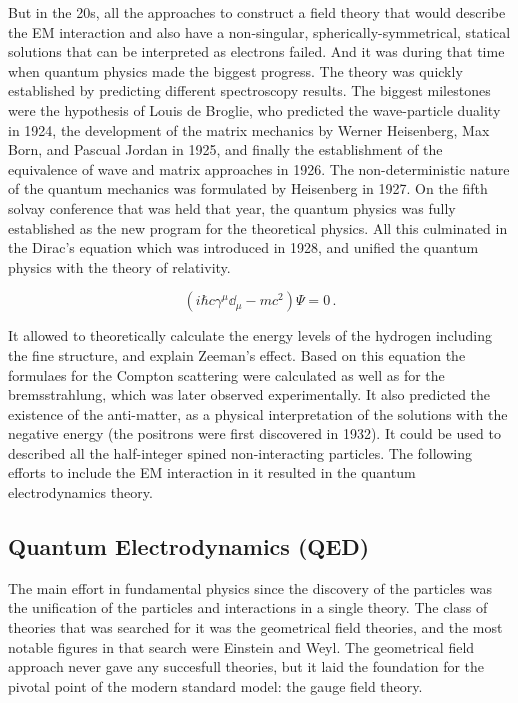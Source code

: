 But in the 20s, all the approaches to construct a field theory that would describe the EM interaction and also have a non-singular, spherically-symmetrical, statical solutions that can be interpreted as electrons failed. And it was during that time when quantum physics made the biggest progress. The theory was quickly established by predicting different spectroscopy results. The biggest milestones were the hypothesis of Louis de Broglie, who predicted the wave-particle duality in 1924, the development of the matrix mechanics by Werner Heisenberg, Max Born, and Pascual Jordan in 1925, and finally the establishment of the equivalence of wave and matrix approaches in 1926. The non-deterministic nature of the quantum mechanics was formulated by Heisenberg in 1927. On the fifth solvay conference that was held that year, the quantum physics was fully established as the new program for the theoretical physics. All this culminated in the Dirac's equation which was introduced in 1928, and unified the quantum physics with the theory of relativity.

\begin{equation}
(i \hbar c \gamma^{\mu} \dd_{\mu} - m c^{2})\Psi = 0\,.
\end{equation}

It allowed to theoretically calculate the energy levels of the hydrogen including the fine structure, and explain Zeeman's effect. Based on this equation the formulaes for the Compton scattering were calculated as well as for the bremsstrahlung, which was later observed experimentally. It also predicted the existence of the anti-matter, as a physical interpretation of the solutions with the negative energy (the positrons were first discovered in 1932). It could be used to described all the half-integer spined non-interacting particles. The following efforts to include the EM interaction in it resulted in the quantum electrodynamics theory.

\subsection{Quantum Electrodynamics (QED)}

The main effort in fundamental physics since the discovery of the particles was the unification of the particles and interactions in a single theory. The class of theories that was searched for it was the geometrical field theories, and the most notable figures in that search were Einstein and Weyl. The geometrical field approach never gave any succesfull theories, but it laid the foundation for the pivotal point of the modern standard model: the gauge field theory.

